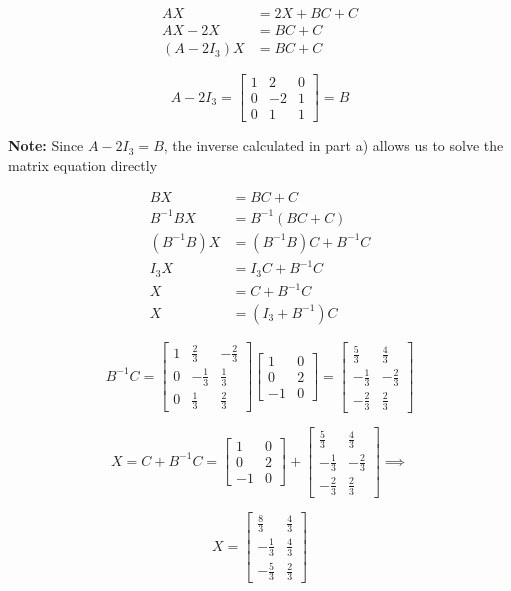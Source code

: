 \begin{answer}
    $$
    \begin{aligned}
        AX &= 2X+BC+C\\
        AX-2X &= BC+C\\
        (A-2I_3)X &= BC+C
    \end{aligned}
    $$

    $$
    A-2I_3=
    \begin{bmatrix}
        1 & 2 & 0\\
        0 & -2 & 1\\
        0 & 1 & 1
    \end{bmatrix}
    =B
    $$

    {\color{red}
    \textbf{Note:} Since $A-2I_3=B$, the inverse
    calculated in part a) allows us to solve
    the matrix equation directly
    }

    $$
    \begin{aligned}
        BX &= BC+C\\
        B^{-1}BX &= B^{-1}(BC+C)\\
        (B^{-1}B)X &= (B^{-1}B)C+B^{-1}C\\
        I_3X &= I_3C+B^{-1}C\\
        X &= C+B^{-1}C\\
        X &= (I_3+B^{-1})C
    \end{aligned}
    $$

    $$
    B^{-1}C=
    \begin{bmatrix}
        1 & \frac23 & -\frac23\\
        0 & -\frac13 & \frac13\\
        0 & \frac13 & \frac23
    \end{bmatrix}
    \begin{bmatrix}
        1 & 0\\
        0 & 2\\
        -1 & 0
    \end{bmatrix}
    =
    \begin{bmatrix}
        \frac53 & \frac43\\
        -\frac13 & -\frac23\\
        -\frac23 & \frac23
    \end{bmatrix}
    $$

    $$
    X=C+B^{-1}C
    =
    \begin{bmatrix}
        1 & 0\\
        0 & 2\\
        -1 & 0
    \end{bmatrix}
    +
    \begin{bmatrix}
        \frac53 & \frac43\\
        -\frac13 & -\frac23\\
        -\frac23 & \frac23
    \end{bmatrix}
    \implies
    $$

    $$
    \boxed{
    X=
    \begin{bmatrix}
        \frac83 & \frac43\\
        -\frac13 & \frac43\\
        -\frac53 & \frac23
    \end{bmatrix}
    }
    $$
\end{answer}
